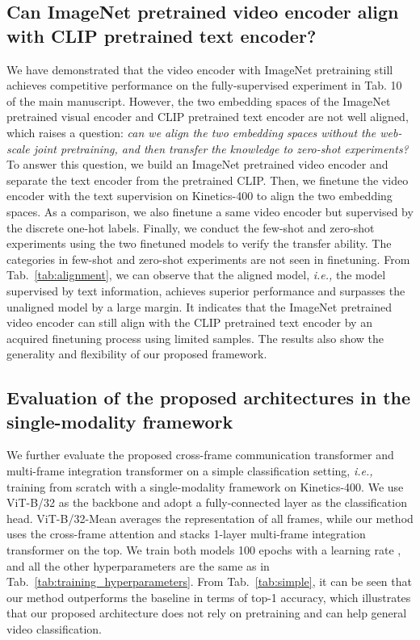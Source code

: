 \documentclass[runningheads]{llncs}
\begin{document}
\subsection{Can ImageNet pretrained video encoder align with CLIP pretrained text encoder?}\label{sec:fewshot}
We have demonstrated that the video encoder with ImageNet pretraining still achieves competitive performance on the fully-supervised experiment in Tab. 10 of the main manuscript. However, the two embedding spaces of the ImageNet pretrained visual encoder and CLIP pretrained text encoder are not well aligned, which raises a question: \textit{can we align the two embedding spaces without the web-scale joint pretraining, and then transfer the knowledge to zero-shot experiments?} To answer this question, we build an ImageNet pretrained video encoder and separate the text encoder from the pretrained CLIP. Then, we finetune the video encoder with the text supervision on Kinetics-400 to align the two embedding spaces. As a comparison, we also finetune a same video encoder but supervised by the discrete one-hot labels. Finally, we conduct the few-shot and zero-shot experiments using the two finetuned models to verify the transfer ability. The categories in few-shot and zero-shot experiments are not seen in finetuning. From Tab.~\ref{tab:alignment}, we can observe that the aligned model, \emph{i.e.,} the model supervised by text information, achieves superior performance and surpasses the unaligned model by a large margin. It indicates that the ImageNet pretrained video encoder can still align with the CLIP pretrained text encoder by an acquired finetuning process using limited samples. The results also show the generality and flexibility of our proposed framework.


\subsection{Evaluation of the proposed architectures in the single-modality framework}\label{sec:simple}
We further evaluate the proposed cross-frame communication transformer and multi-frame integration transformer on a simple classification setting, \emph{i.e.,} training from scratch with a single-modality framework on Kinetics-400. We use ViT-B/32 as the backbone and adopt a fully-connected layer as the classification head. ViT-B/32-Mean averages the representation of all frames, while our method uses the cross-frame attention and stacks 1-layer multi-frame integration transformer on the top. We train both models 100 epochs with a learning rate , and all the other hyperparameters are the same as in Tab.~\ref{tab:training_hyperparameters}. From Tab.~\ref{tab:simple}, it can be seen that our method outperforms the baseline  in terms of top-1 accuracy, which illustrates that our proposed architecture does not rely on pretraining and can help general video classification.
\end{document}
